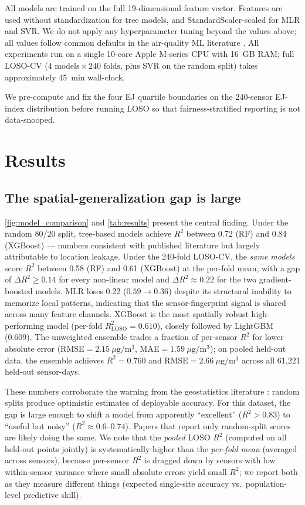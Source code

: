 \documentclass{article}
\begin{document}
All models are trained on the full 19-dimensional feature vector. Features are used without standardization for tree models, and StandardScaler-scaled for MLR and SVR. We do not apply any hyperparameter tuning beyond the values above; all values follow common defaults in the air-quality ML literature \citep{ghahremanloo2021, zhang2024unmasking}. All experiments run on a single 10-core Apple M-series CPU with 16~GB RAM; full LOSO-CV ($4 \text{ models} \times 240 \text{ folds}$, plus SVR on the random split) takes approximately \SI{45}{min} wall-clock.

We pre-compute and fix the four EJ quartile boundaries on the 240-sensor EJ-index distribution before running LOSO so that fairness-stratified reporting is not data-snooped.

\section{Results}
\label{sec:results}

\subsection{The spatial-generalization gap is large}

\autoref{fig:model_comparison} and \autoref{tab:results} present the central finding. Under the random 80/20 split, tree-based models achieve $R^2$ between 0.72 (RF) and 0.84 (XGBoost) --- numbers consistent with published literature but largely attributable to location leakage. Under the 240-fold LOSO-CV, the \emph{same models} score $R^2$ between 0.58 (RF) and 0.61 (XGBoost) at the per-fold mean, with a gap of $\Delta R^2 \geq 0.14$ for every non-linear model and $\Delta R^2 \approx 0.22$ for the two gradient-boosted models. MLR loses 0.22 ($0.59 \rightarrow 0.36$) despite its structural inability to memorize local patterns, indicating that the sensor-fingerprint signal is shared across many feature channels. XGBoost is the most spatially robust high-performing model (per-fold $R^2_{\mathrm{LOSO}} = 0.610$), closely followed by LightGBM (0.609). The unweighted ensemble trades a fraction of per-sensor $R^2$ for lower absolute error (RMSE$=2.15~\mu\mathrm{g}/\mathrm{m}^3$, MAE$=1.59~\mu\mathrm{g}/\mathrm{m}^3$); on pooled held-out data, the ensemble achieves $R^2 = 0.760$ and RMSE$=2.66~\mu\mathrm{g}/\mathrm{m}^3$ across all 61{,}221 held-out sensor-days.

These numbers corroborate the warning from the geostatistics literature \citep{roberts2017cross, meyer2019importance}: random splits produce optimistic estimates of deployable accuracy. For this dataset, the gap is large enough to shift a model from apparently ``excellent'' ($R^2 > 0.83$) to ``useful but noisy'' ($R^2 \approx 0.6$--$0.74$). Papers that report only random-split scores are likely doing the same. We note that the \emph{pooled} LOSO $R^2$ (computed on all held-out points jointly) is systematically higher than the \emph{per-fold mean} (averaged across sensors), because per-sensor $R^2$ is dragged down by sensors with low within-sensor variance where small absolute errors yield small $R^2$; we report both as they measure different things (expected single-site accuracy vs.\ population-level predictive skill).
\end{document}
